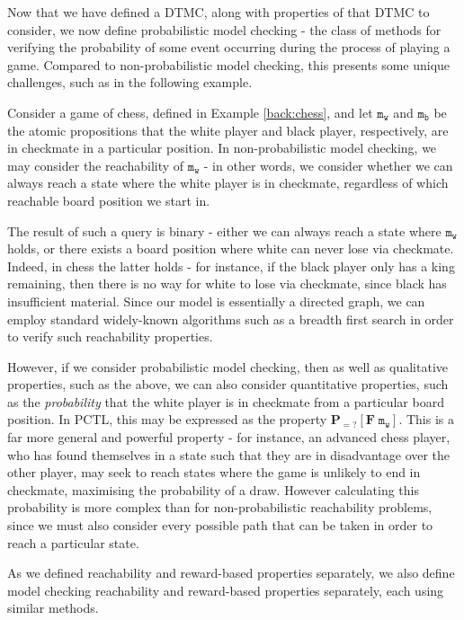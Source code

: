 Now that we have defined a DTMC, along with properties of that DTMC to consider, we now define probabilistic model checking - the class of methods for verifying the probability of some event occurring during the process of playing a game. Compared to non-probabilistic model checking, this presents some unique challenges, such as in the following example.

\begin{example}
\label{back:chess-reachability}
    Consider a game of chess, defined in Example \ref{back:chess}, and let $\mathtt{m_w}$ and $\mathtt{m_b}$ be the atomic propositions that the white player and black player, respectively, are in checkmate in a particular position. In non-probabilistic model checking, we may consider the reachability of $\mathtt{m_w}$ - in other words, we consider whether we can always reach a state where the white player is in checkmate, regardless of which reachable board position we start in.
    
    The result of such a query is binary - either we can always reach a state where $\mathtt{m_w}$ holds, or there exists a board position where white can never lose via checkmate. Indeed, in chess the latter holds - for instance, if the black player only has a king remaining, then there is no way for white to lose via checkmate, since black has insufficient material. Since our model is essentially a directed graph, we can employ standard widely-known algorithms such as a breadth first search in order to verify such reachability properties.

    However, if we consider probabilistic model checking, then as well as qualitative properties, such as the above, we can also consider quantitative properties, such as the \emph{probability} that the white player is in checkmate from a particular board position. In PCTL, this may be expressed as the property $\mathbf{P}_{=?} [\mathbf{F} \; \mathtt{m_w}]$. This is a far more general and powerful property - for instance, an advanced chess player, who has found themselves in a state such that they are in disadvantage over the other player, may seek to reach states where the game is unlikely to end in checkmate, maximising the probability of a draw. However calculating this probability is more complex than for non-probabilistic reachability problems, since we must also consider every possible path that can be taken in order to reach a particular state.
\end{example}

As we defined reachability and reward-based properties separately, we also define model checking reachability and reward-based properties separately, each using similar methods.

